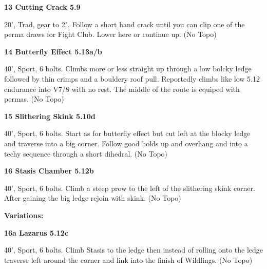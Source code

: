 \begin{multicols}{2}
\needspace{1.5cm}
\label{rt:Cutting Crack}
\colorbox{green!20}{
\parbox{0.95\linewidth}{
\textbf{
13 Cutting Crack 5.9  
}}}
\begin{adjustwidth}{0.5cm}{}			
20', Trad, gear to 2". Follow a short hand crack until you can clip one of the perma draws for Fight Club. Lower here or continue up.
  (No Topo)
\end{adjustwidth}




\needspace{1.5cm}
\label{rt:Butterfly Effect}
\colorbox{Goldenrod!20}{
\parbox{0.95\linewidth}{
\textbf{
14 Butterfly Effect 5.13a/b  
}}}
\begin{adjustwidth}{0.5cm}{}			
40', Sport, 6 bolts. Climbs more or less straight up through a low bolcky ledge followed by thin crimps and a bouldery roof pull. Reportedly climbs like low 5.12 endurance into V7/8 with no rest. The middle of the route is equiped with permas.
  (No Topo)
\end{adjustwidth}




\needspace{1.5cm}
\label{rt:Slithering Skink}
\colorbox{RoyalBlue!20}{
\parbox{0.95\linewidth}{
\textbf{
15 Slithering Skink 5.10d  
}}}
\begin{adjustwidth}{0.5cm}{}			
40', Sport, 6 bolts. Start as for butterfly effect but cut left at the blocky ledge and traverse into a big corner. Follow good holds up and overhang and into a techy sequence through a short dihedral.
  (No Topo)
\end{adjustwidth}




\needspace{1.5cm}
\label{rt:Stasis Chamber}
\colorbox{Goldenrod!20}{
\parbox{0.95\linewidth}{
\textbf{
16 Stasis Chamber 5.12b  
}}}
\begin{adjustwidth}{0.5cm}{}			
40', Sport, 6 bolts. Climb a steep prow to the left of the slithering skink corner. After gaining the big ledge rejoin with skink.
  (No Topo)
\end{adjustwidth}


\begin{adjustwidth}{0.5cm}{}				
\needspace{3cm}
\textbf{Variations:} \newline

\needspace{1.5cm}
\label{vr:Lazarus}
\colorbox{Goldenrod!20}{
\parbox{0.95\linewidth}{
\textbf{
16a Lazarus 5.12c  
}}}
\begin{adjustwidth}{0.5cm}{}			
40', Sport, 6 bolts. Climb Stasis to the ledge then instead of rolling onto the ledge traverse left around the corner and link into the finish of Wildlings.
  (No Topo)
\end{adjustwidth}




\end{adjustwidth}
\end{multicols}
